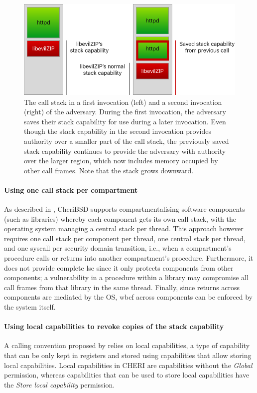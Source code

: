 \documentclass[main.tex]{subfiles}
\begin{document}
\begin{figure}
	\begin{center}
		\includegraphics{Images/Saved Stack Cap.pdf}
	\end{center}
	\caption{The call stack in a first invocation (left) and a second invocation (right) of the adversary. During the first invocation, the adversary saves their stack capability for use during a later invocation. Even though the stack capability in the second invocation provides authority over a smaller part of the call stack, the previously saved stack capability continues to provide the adversary with authority over the larger region, which now includes memory occupied by other call frames. Note that the stack grows downward.}
	\label{fig:savedstackcap}
\end{figure}

\paragraph{Using one call stack per compartment} As described in \cite{compartment}, CheriBSD supports compartmentalising software components (such as libraries) whereby each component gets its own call stack, with the operating system managing a central stack per thread. This approach however requires one call stack per component per thread, one central stack per thread, and one syscall per security domain transition, i.e., when a compartment's procedure calls or returns into another compartment's procedure. Furthermore, it does not provide complete \gls{lse} since it only protects components from other components; a vulnerability in a procedure within a library may compromise all call frames from that library in the same thread. Finally, since returns across components are mediated by the OS, \gls{wbcf} across components can be enforced by the system itself.

\paragraph{Using local capabilities to revoke copies of the stack capability} A calling convention proposed by \cite{retptr} relies on local capabilities, a type of capability that can be only kept in registers and stored using capabilities that allow storing local capabilities. Local capabilities in CHERI are capabilities without the \emph{Global} permission, whereas capabilities that can be used to store local capabilities have the \emph{Store local capability} permission.
\end{document}
